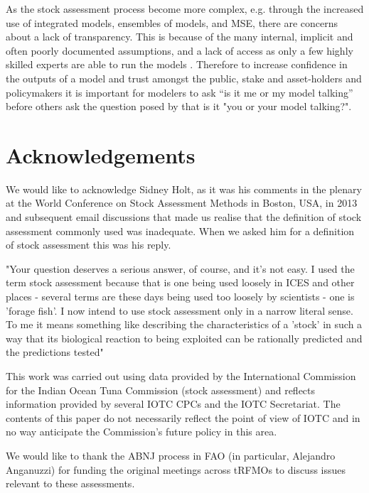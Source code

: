 \documentclass[12pt,halfline,a4paper,nonumbib]{ouparticle}
\begin{document}
As the stock assessment process become more complex, e.g. through the increased use of integrated models, ensembles of models, and MSE, there are concerns about a lack of transparency. This is because of the many internal, implicit and often poorly documented assumptions, and a lack of access as only a few highly skilled experts are able to run the models \citep{hilborn2003state}. Therefore to increase confidence in the outputs of a model and trust amongst the public, stake and asset-holders and policymakers it is important for modelers to ask “is it me or my model talking” before others ask the question posed by \cite{hodges1992you} that is it "you or your model talking?".

\section{Acknowledgements}

We would like to acknowledge Sidney Holt, as it was his comments in the plenary at the World Conference on Stock Assessment Methods in Boston, USA, in 2013 and subsequent email discussions that made us realise that the definition of stock assessment commonly used was inadequate. When we asked him for a definition of stock assessment this was his reply.

"Your question deserves a serious answer, of course, and it's not easy. I used the term stock assessment because that is one being used loosely in ICES and other places - several terms are these days being used too loosely by scientists - one is 'forage fish'. I now intend to use stock assessment only in a narrow literal sense. To me it means something like describing the characteristics of a 'stock' in such a way that its biological reaction to being exploited can be rationally predicted and the predictions tested"

This work was carried out using data provided by the International Commission for the Indian  Ocean  Tuna  Commission  (stock assessment)  and  reflects  information  provided  by  several IOTC CPCs and the IOTC Secretariat.  The contents of this paper do not necessarily reflect the point of view of IOTC and in no way anticipate the Commission's future policy in this area.

We would like to thank the ABNJ process in FAO (in particular, Alejandro Anganuzzi) for funding the original meetings across tRFMOs to discuss issues relevant to these assessments. 

\clearpage
\newpage
\printbibliography
\end{document}
